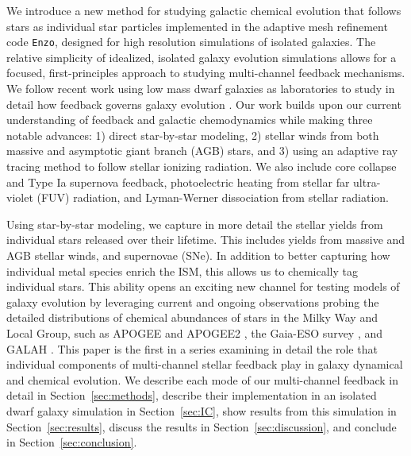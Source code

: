 \documentclass[fleqn,usenatbib,useAMS]{mnras}
\begin{document}
We introduce a new method for studying galactic chemical evolution that follows stars as individual star particles implemented in the adaptive mesh refinement code \texttt{Enzo}, designed for high resolution simulations of isolated galaxies. The relative simplicity of idealized, isolated galaxy evolution simulations allows for a focused, first-principles approach to studying multi-channel feedback mechanisms. We follow recent work using low mass dwarf galaxies as laboratories to study in detail how feedback governs galaxy evolution \citep{Forbes2016,Hu2016,Hu2017}.
Our work builds upon our current understanding of feedback and galactic chemodynamics while making three notable advances: 1) direct star-by-star modeling, 2) stellar winds from both massive and asymptotic giant branch (AGB) stars, and 3) using an adaptive ray tracing method to follow stellar ionizing radiation. We also include core collapse and Type Ia supernova feedback, photoelectric heating from stellar far ultra-violet (FUV) radiation, and Lyman-Werner dissociation from stellar radiation. 

Using star-by-star modeling, we capture in more detail the stellar yields from individual stars released over their lifetime. This includes yields from massive and AGB stellar winds, and supernovae (SNe). In addition to better capturing how individual metal species enrich the ISM, this allows us to chemically tag individual stars. This ability opens an exciting new channel for testing models of galaxy evolution by leveraging current and ongoing observations probing the detailed distributions of chemical abundances of stars in the Milky Way and Local Group, such as APOGEE and APOGEE2 \citep{APOGEE2010,APOGEE}, the Gaia-ESO survey \citep{Gaia}, and GALAH \citep{GALAH}. This paper is the first in a series examining in detail the role that individual components of multi-channel stellar feedback play in galaxy dynamical and chemical evolution. We describe each mode of our multi-channel feedback 
in detail in Section~\ref{sec:methods}, describe their implementation in an isolated dwarf galaxy simulation in Section~\ref{sec:IC}, show results from this simulation in Section~\ref{sec:results}, discuss the results in Section~\ref{sec:discussion}, and conclude in Section~\ref{sec:conclusion}.
\end{document}

